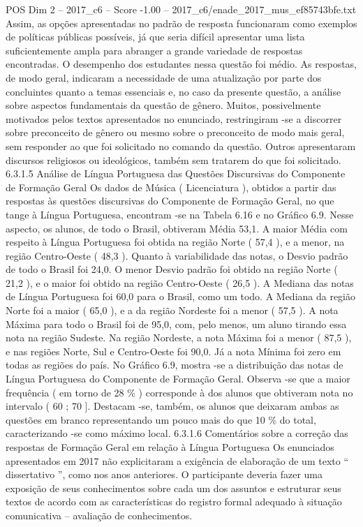 \begin{textsample}{POS Dim 2 – 2017\_c6 – Score -1.00 – 2017\_c6/enade\_2017\_mus\_ef85743bfe.txt}
Assim, as opções apresentadas no padrão de resposta funcionaram como exemplos de políticas públicas possíveis, já que seria difícil apresentar uma lista suficientemente ampla para abranger a grande variedade de respostas encontradas.
O desempenho dos estudantes nessa questão foi médio.
As respostas, de modo geral, indicaram a necessidade de uma atualização por parte dos concluintes quanto a temas essenciais e, no caso da presente questão, a análise sobre aspectos fundamentais da questão de gênero.
Muitos, possivelmente motivados pelos textos apresentados no enunciado, restringiram -se a discorrer sobre preconceito de gênero ou mesmo sobre o preconceito de modo mais geral, sem responder ao que foi solicitado no comando da questão.
Outros apresentaram discursos religiosos ou ideológicos, também sem tratarem do que foi solicitado. 6.3.1.5 Análise de Língua Portuguesa das Questões Discursivas do Componente de Formação Geral Os dados de Música ( Licenciatura ), obtidos a partir das respostas às questões discursivas do Componente de Formação Geral, no que tange à Língua Portuguesa, encontram -se na Tabela 6.16 e no Gráfico 6.9.
Nesse aspecto, os alunos, de todo o Brasil, obtiveram Média 53,1.
A maior Média com respeito à Língua Portuguesa foi obtida na região Norte ( 57,4 ), e a menor, na região Centro-Oeste ( 48,3 ).
Quanto à variabilidade das notas, o Desvio padrão de todo o Brasil foi 24,0.
O menor Desvio padrão foi obtido na região Norte ( 21,2 ), e o maior foi obtido na região Centro-Oeste ( 26,5 ).
A Mediana das notas de Língua Portuguesa foi 60,0 para o Brasil, como um todo.
A Mediana da região Norte foi a maior ( 65,0 ), e a da região Nordeste foi a menor ( 57,5 ).
A nota Máxima para todo o Brasil foi de 95,0, com, pelo menos, um aluno tirando essa nota na região Sudeste.
Na região Nordeste, a nota Máxima foi a menor ( 87,5 ), e nas regiões Norte, Sul e Centro-Oeste foi 90,0.
Já a nota Mínima foi zero em todas as regiões do país.
No Gráfico 6.9, mostra -se a distribuição das notas de Língua Portuguesa do Componente de Formação Geral.
Observa -se que a maior frequência ( em torno de 28 \% ) corresponde à dos alunos que obtiveram nota no intervalo ( 60 ; 70 ].
Destacam -se, também, os alunos que deixaram ambas as questões em branco representando um pouco mais do que 10 \% do total, caracterizando -se como máximo local. 6.3.1.6 Comentários sobre a correção das respostas de Formação Geral em relação à Língua Portuguesa Os enunciados apresentados em 2017 não explicitaram a exigência de elaboração de um texto “ dissertativo ”, como nos anos anteriores.
O participante deveria fazer uma exposição de seus conhecimentos sobre cada um dos assuntos e estruturar seus textos de acordo com as características do registro formal adequado à situação comunicativa – avaliação de conhecimentos.

\end{textsample}
